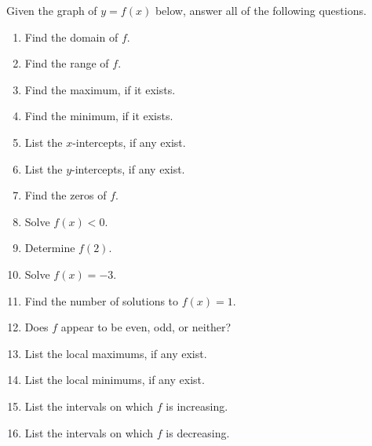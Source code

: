 \documentclass{ximera}
\begin{document}
\begin{example}  Given the graph of $y = f(x)$ below, answer all of the following questions.
\label{tame}


\begin{enumerate}

\item  Find the domain of $f$.

\item  Find the range of $f$.


\item  Find the maximum, if it exists.

\item  Find the minimum, if it exists.



\item  List the $x$-intercepts, if any exist.

\item  List the $y$-intercepts, if any exist.



\item  Find the zeros of $f$.

\item  Solve $f(x) < 0$.


\item  Determine $f(2)$.

\item  Solve $f(x) = -3$.  



\item  Find the number of solutions to $f(x) = 1$.

\item  Does $f$ appear to be even, odd, or neither?



\item  List the local maximums, if any exist.

\item  List the local minimums, if any exist.



\item  List the intervals on which $f$ is increasing.

\item  List the intervals on which $f$ is decreasing.

\end{enumerate}


\end{example}
\end{document}

